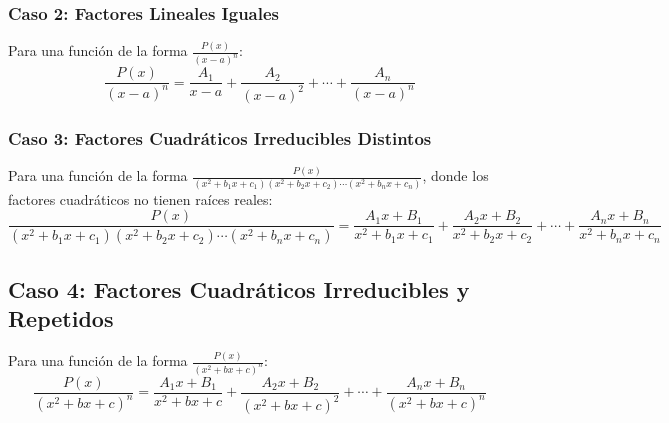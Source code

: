 \subsubsection{Caso 2: Factores Lineales Iguales}
Para una función de la forma \(\frac{P(x)}{(x-a)^n}\):
\begin{equation}
    \frac{P(x)}{(x-a)^n} = \frac{A_1}{x-a} + \frac{A_2}{(x-a)^2} + \cdots + \frac{A_n}{(x-a)^n}
\end{equation}
\subsubsection{Caso 3: Factores Cuadráticos Irreducibles Distintos}
Para una función de la forma \(\frac{P(x)}{(x^2 + b_1x + c_1)(x^2 + b_2x + c_2)\cdots(x^2 + b_nx + c_n)}\), donde los factores cuadráticos no tienen raíces reales:
\begin{equation}
    \frac{P(x)}{(x^2 + b_1x + c_1)(x^2 + b_2x + c_2)\cdots(x^2 + b_nx + c_n)} = \frac{A_1x + B_1}{x^2 + b_1x + c_1} + \frac{A_2x + B_2}{x^2 + b_2x + c_2} + \cdots + \frac{A_nx + B_n}{x^2 + b_nx + c_n}
\end{equation}
\subsection*{Caso 4: Factores Cuadráticos Irreducibles y Repetidos}
Para una función de la forma \(\frac{P(x)}{(x^2 + bx + c)^n}\):
\begin{equation}
    \frac{P(x)}{(x^2 + bx + c)^n} = \frac{A_1x + B_1}{x^2 + bx + c} + \frac{A_2x + B_2}{(x^2 + bx + c)^2} + \cdots + \frac{A_nx + B_n}{(x^2 + bx + c)^n}
\end{equation}
\newpage
